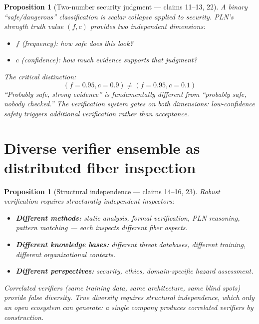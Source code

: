 \documentclass[11pt,a4paper]{article}
\newtheorem{proposition}[definition]{Proposition}
\begin{document}
\begin{proposition}[Two-number security judgment --- claims 11--13, 22]
\label{prop:pln_security}
A binary ``safe/dangerous'' classification is scalar collapse applied to
security. PLN's strength truth value $(f, c)$ provides two independent
dimensions:
\begin{itemize}
  \item $f$ (frequency): how safe does this look?
  \item $c$ (confidence): how much evidence supports that judgment?
\end{itemize}
The critical distinction:
\[
  (f=0.95, c=0.9) \neq (f=0.95, c=0.1)
\]
``Probably safe, strong evidence'' is fundamentally different from
``probably safe, nobody checked.'' The verification system gates on
both dimensions: low-confidence safety triggers additional verification
rather than acceptance.
\end{proposition}

\section{Diverse verifier ensemble as distributed fiber inspection}

\begin{proposition}[Structural independence --- claims 14--16, 23]
\label{prop:diversity}
Robust verification requires structurally independent inspectors:
\begin{itemize}
  \item \textbf{Different methods:} static analysis, formal verification,
    PLN reasoning, pattern matching --- each inspects different fiber
    aspects.
  \item \textbf{Different knowledge bases:} different threat databases,
    different training, different organizational contexts.
  \item \textbf{Different perspectives:} security, ethics, domain-specific
    hazard assessment.
\end{itemize}
Correlated verifiers (same training data, same architecture, same blind
spots) provide false diversity. True diversity requires structural
independence, which only an open ecosystem can generate: a single company
produces correlated verifiers by construction.
\end{proposition}


\end{document}
